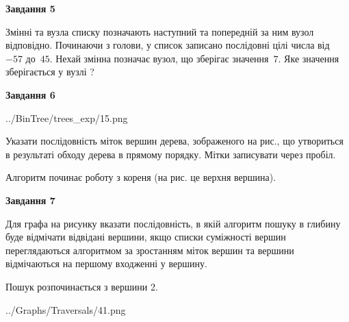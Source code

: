 \documentclass[12pt, ukrainian]{article}
\begin{document}
{\begin {large}
{\begin {center}\textbf{Завдання 5}\end {center}}\par
Змінні  та  вузла списку позначають наступний та попередній за ним вузол відповідно. Починаючи з голови, у список записано послідовні цілі числа від~$-57$ до~$45$. Нехай змінна  позначає вузол, що зберігає значення~$7$.
Яке значення зберігається у вузлі  ?\par
\newpage

{\begin {center}\textbf{Завдання 6}\end {center}}\par

\begin{center}
	{../BinTree/trees_exp/15.png}
\end{center}
Указати послідовність міток вершин дерева, зображеного на рис., що утвориться в результаті обходу дерева в прямому порядку. Мітки записувати через пробіл.\par Алгоритм починає роботу з кореня (на рис. це верхня вершина).\par
\newpage

{\begin {center}\textbf{Завдання 7}\end {center}}\par
Для графа на рисунку вказати послідовність, в якій алгоритм пошуку в глибину буде відмічати відвідані вершини, якщо списки суміжності вершин переглядаються алгоритмом за зростанням міток вершин та вершини відмічаються на першому вход\-женні у вершину.\par
Пошук розпочинається з вершини 2.\par

\begin{center}
	{../Graphs/Traversals/41.png}
\end{center}\par
\newpage


\end{large}}
\end{document}
